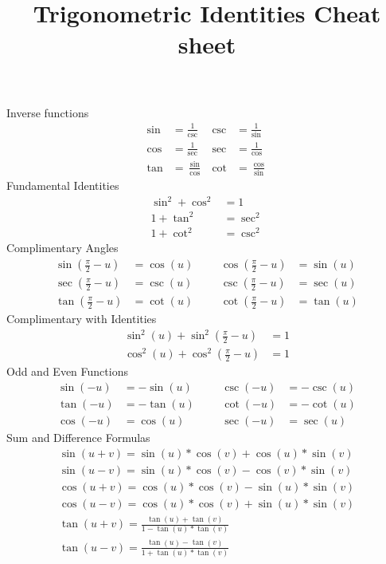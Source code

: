 \documentclass{article}
\title{\vspace{-5ex}Trigonometric Identities Cheat sheet  \vspace{-5ex}}
\author{}
\date{}
\newcommand{\nine}{\frac{\pi}{2}}
\begin{document}
	\maketitle{}
	
	Inverse functions
	\begin{align*}
		\sin &= \frac{1}{\csc}  & \csc & = \frac{1}{\sin} \\
		\cos &= \frac{1}{\sec} & \sec & = \frac{1}{\cos} \\
		\tan &= \frac{\sin}{\cos}  & \cot & = \frac{\cos}{\sin}
	\end{align*}
	Fundamental Identities
	\begin{align*}
		\sin^2 + \cos^2 &= 1 \\
		1 + \tan^2 &= \sec^2 \\
		1 + \cot^2 &= \csc^2
	\end{align*}
	Complimentary Angles
	\begin{align*}
		\sin(\nine - u) &= \cos(u)  & & & \cos(\nine - u) &= \sin(u) \\
		\sec(\nine - u) &= \csc(u) & & & \csc(\nine - u) &= \sec(u) \\
		\tan(\nine - u) &= \cot(u) & & & \cot(\nine - u) &= \tan(u)
	\end{align*}
	Complimentary with Identities
	\begin{align*}
		\sin^2(u) + \sin^2(\frac{\pi}{2} - u) &= 1 \\
		\cos^2(u) + \cos^2(\frac{\pi}{2} - u) &= 1
	\end{align*}
	Odd and Even Functions
	\begin{align*}
		\sin(-u) &= -\sin(u)  & & & \csc(-u) &= -\csc(u) \\
		\tan(-u) &= -\tan(u) & & & \cot(-u) &= -\cot(u) \\
		\cos(-u) &= \cos(u) & & & \sec(-u) &= \sec(u)
	\end{align*}
	Sum and Difference Formulas
	\begin{align*}
		\sin(u + v) = \sin(u) * \cos(v) + \cos(u) * \sin(v) \\
		\sin(u - v) = \sin(u)  * \cos(v) - \cos(v) * \sin(v) \\
		\cos(u + v) = \cos(u) * \cos(v) - \sin(u) * \sin(v) \\
		\cos(u - v) = \cos(u) * \cos(v) + \sin(u) * \sin(v) \\
		\tan(u + v) = \frac{\tan(u) + \tan(v)}{1 - \tan(u) * \tan(v)} \\
		\tan(u - v) = \frac{\tan(u) - \tan(v)}{1 + \tan(u) * \tan(v)}
	\end{align*}
\end{document}
